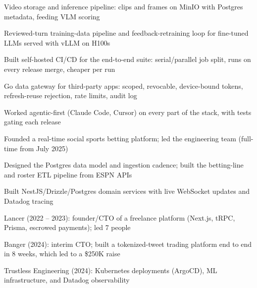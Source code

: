 \documentclass[print]{jack-resume}
\begin{document}
\begin{tightemize}
    \item Video storage and inference pipeline: clips and frames on MinIO with Postgres metadata, feeding VLM scoring
    \item Reviewed-turn training-data pipeline and feedback-retraining loop for fine-tuned LLMs served with vLLM on H100s
    \item Built self-hosted CI/CD for the end-to-end suite: serial/parallel job split, runs on every release merge, cheaper per run
    \item Go data gateway for third-party apps: scoped, revocable, device-bound tokens, refresh-reuse rejection, rate limits, audit log
    \item Worked agentic-first (Claude Code, Cursor) on every part of the stack, with tests gating each release
\end{tightemize}
\sectionsep

\begin{tightemize}
    \item Founded a real-time social sports betting platform; led the engineering team (full-time from July 2025)
    \item Designed the Postgres data model and ingestion cadence; built the betting-line and roster ETL pipeline from ESPN APIs
    \item Built NestJS/Drizzle/Postgres domain services with live WebSocket updates and Datadog tracing
\end{tightemize}
\sectionsep

\begin{tightemize}
    \item Lancer (2022 -- 2023): founder/CTO of a freelance platform (Next.js, tRPC, Prisma, escrowed payments); led 7 people
    \item Banger (2024): interim CTO; built a tokenized-tweet trading platform end to end in 8 weeks, which led to a \$250K raise
    \item Trustless Engineering (2024): Kubernetes deployments (ArgoCD), ML infrastructure, and Datadog observability
\end{tightemize}
\sectionsep
\end{document}
